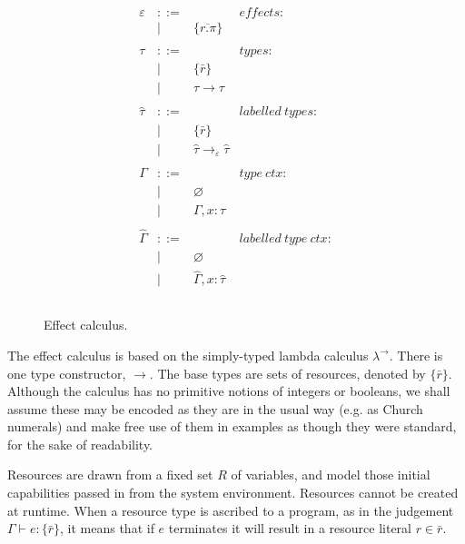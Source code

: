 \begin{figure}[h]
\[\begin{array}{lll}
\begin{array}{lllr}
\varepsilon & ::= & ~ & effects: \\
	& | & \{ \overline{r.\pi} \} \\
	&&\\

\tau & ::= & ~ & types: \\
		& | & \{ \bar r \} \\
		& | & \tau \rightarrow \tau \\ 
		&&\\

\hat \tau & ::= & ~ & labelled ~types: \\
		& | & \{ \bar r \} \\
		& | & \hat \tau \rightarrow_{\varepsilon} \hat \tau \\
		&&\\

\Gamma & ::= & ~ & type~ctx: \\
				& | & \varnothing \\
				& | & \Gamma, x: \tau \\
				&&\\
				
\hat \Gamma & ::= & ~ & labelled~type~ctx:\\
				& | & \varnothing \\
				& | & \hat \Gamma, x: \hat \tau \\
				&&\\

\end{array}

\end{array}
\]

\vspace{-7pt}
\caption{Effect calculus.}
\label{This is the label.}
\end{figure}

The effect calculus is based on the simply-typed lambda calculus $\lambda^{\rightarrow}$. There is one type constructor, $\rightarrow$. The base types are sets of resources, denoted by $\{ \bar r \}$. Although the calculus has no primitive notions of integers or booleans, we shall assume these may be encoded as they are in the usual way (e.g. as Church numerals) and make free use of them in examples as though they were standard, for the sake of readability.

Resources are drawn from a fixed set $R$ of variables, and model those initial capabilities passed in from the system environment. Resources cannot be created at runtime. When a resource type is ascribed to a program, as in the judgement $\Gamma \vdash e: \{ \bar r \}$, it means that if $e$ terminates it will result in a resource literal $r \in \bar r$.

